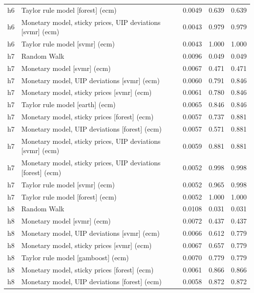 \begin{ThreePartTable}
\begin{longtable}[t]{cp{5.5cm}ccc}
h6 & \raggedright Taylor rule model [forest] (ecm) & 0.0049 & 0.639 & 0.639\\
h6 & \raggedright Monetary model, sticky prices, UIP deviations [svmr] (ecm) & 0.0043 & 0.979 & 0.979\\
h6 & \raggedright Taylor rule model [svmr] (ecm) & 0.0043 & 1.000 & 1.000\\
\addlinespace
h7 & \raggedright Random Walk & 0.0096 & 0.049 & 0.049\\
h7 & \raggedright Monetary model [svmr] (ecm) & 0.0067 & 0.471 & 0.471\\
h7 & \raggedright Monetary model, UIP deviations [svmr] (ecm) & 0.0060 & 0.791 & 0.846\\
h7 & \raggedright Monetary model, sticky prices [svmr] (ecm) & 0.0061 & 0.780 & 0.846\\
h7 & \raggedright Taylor rule model [earth] (ecm) & 0.0065 & 0.846 & 0.846\\
h7 & \raggedright Monetary model, sticky prices [forest] (ecm) & 0.0057 & 0.737 & 0.881\\
h7 & \raggedright Monetary model, UIP deviations [forest] (ecm) & 0.0057 & 0.571 & 0.881\\
h7 & \raggedright Monetary model, sticky prices, UIP deviations [svmr] (ecm) & 0.0059 & 0.881 & 0.881\\
h7 & \raggedright Monetary model, sticky prices, UIP deviations [forest] (ecm) & 0.0052 & 0.998 & 0.998\\
h7 & \raggedright Taylor rule model [svmr] (ecm) & 0.0052 & 0.965 & 0.998\\
h7 & \raggedright Taylor rule model [forest] (ecm) & 0.0052 & 1.000 & 1.000\\
\addlinespace
h8 & \raggedright Random Walk & 0.0108 & 0.031 & 0.031\\
h8 & \raggedright Monetary model [svmr] (ecm) & 0.0072 & 0.437 & 0.437\\
h8 & \raggedright Monetary model, UIP deviations [svmr] (ecm) & 0.0066 & 0.612 & 0.779\\
h8 & \raggedright Monetary model, sticky prices [svmr] (ecm) & 0.0067 & 0.657 & 0.779\\
h8 & \raggedright Taylor rule model [gamboost] (ecm) & 0.0070 & 0.779 & 0.779\\
h8 & \raggedright Monetary model, sticky prices [forest] (ecm) & 0.0061 & 0.866 & 0.866\\
h8 & \raggedright Monetary model, UIP deviations [forest] (ecm) & 0.0058 & 0.872 & 0.872\\

\end{longtable}
\end{ThreePartTable}
